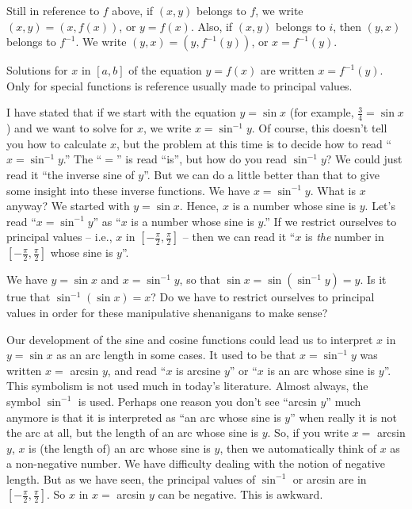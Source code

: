 \documentclass[english]{book}
\begin{document}
Still in reference to $f$ above, if $(x,y)$ belongs to $f$, we write $(x,y) = (x,f(x))$, or $y = f(x)$. Also, if $(x,y)$ belongs to $i$, then $(y,x)$ belongs to $f^{-1}$. We write $(y,x) = (y,f^{-1}(y))$, or $x = f^{-1}(y)$. 

Solutions for $x$ in $[a,b]$ of the equation $y = f(x)$ are written $x = f^{-1}(y)$. Only for special functions is reference usually made to principal values.

\vspace{0.3cm}

I have stated that if we start with the equation $y = \sin x$ (for example, $\frac{3}{4} = \sin x$) and we want to solve for $x$, we write $x = \sin^{-1} y$. Of course, this doesn't tell you how to calculate $x$, but the problem at this time is to decide how to read ``$x = \sin^{-1} y$.'' The ``$=$'' is read ``is'', but how do you read $\sin^{-1} y$? We could just read it ``the inverse sine of $y$''. But we can do a little better than that to give some insight into these inverse functions. We have $x = \sin^{-1} y$. What is $x$ anyway? We started with $y = \sin x$. Hence, $x$ is a number whose sine is $y$. Let's read ``$x = \sin^{-1} y$'' as ``$x$ is a number whose sine is $y$.'' If we restrict ourselves to principal values -- i.e., $x$ in $[-\frac{\pi}{2},\frac{\pi}{2}]$ -- then we can read it ``$x$ is \emph{the} number in $[-\frac{\pi}{2},\frac{\pi}{2}]$ whose sine is $y$''.

\vspace{0.3cm}

We have $y = \sin x$ and $x = \sin^{-1}y$, so that $\sin x = \sin(\sin^{-1}y) = y$. Is it true that $\sin^{-1}(\sin x) = x$? Do we have to restrict ourselves to principal values in order for these manipulative shenanigans to make sense?

Our development of the sine and cosine functions could lead us to interpret $x$ in $y = \sin x$ as an arc length in some cases. It used to be that $x = \sin^{-1} y$ was written $x =$ arcsin $y$, and read ``$x$ is arcsine $y$'' or ``$x$ is an arc whose sine is $y$''. This symbolism is not used much in today's literature. Almost always, the symbol $\sin^{-1}$ is used. Perhaps one reason you don't see ``arcsin $y$'' much anymore is that it is interpreted as ``an arc whose sine is $y$'' when really it is not the arc at all, but the length of an arc whose sine is $y$. So, if you write $x =$ arcsin $y$, $x$ is (the length of) an arc whose sine is $y$, then we automatically think of $x$ as a non-negative number. We have difficulty dealing with the notion of negative length. But as we have seen, the principal values of $\sin^{-1}$ or arcsin are in $[-\frac{\pi}{2},\frac{\pi}{2}]$. So $x$ in $x =$ arcsin $y$ can be negative. This is awkward. 
\end{document}
